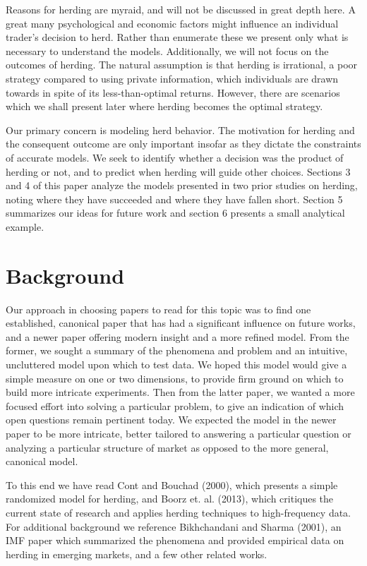 \documentclass{article}
\begin{document}
Reasons for herding are myraid, and will not be discussed in great depth here.
A great many psychological and economic factors might influence an individual trader's decision to herd. 
Rather than enumerate these we present only what is necessary to understand the models.
Additionally, we will not focus on the outcomes of herding.
The natural assumption is that herding is irrational, a poor strategy compared to using private information, which individuals are drawn towards in spite of its less-than-optimal returns.
However, there are scenarios which we shall present later where herding becomes the optimal strategy.

Our primary concern is modeling herd behavior.
The motivation for herding and the consequent outcome are only important insofar as they dictate the constraints of accurate models.
We seek to identify whether a decision was the product of herding or not, and to predict when herding will guide other choices.
Sections 3 and 4 of this paper analyze the models presented in two prior studies on herding, noting where they have succeeded and where they have fallen short. 
Section 5 summarizes our ideas for future work and section 6 presents a small analytical example.

\section{Background}
Our approach in choosing papers to read for this topic was to find one established, canonical paper that has had a significant influence on future works, and a newer paper offering modern insight and a more refined model.
From the former, we sought a summary of the phenomena and problem and an intuitive, uncluttered model upon which to test data.
We hoped this model would give a simple measure on one or two dimensions, to provide firm ground on which to build more intricate experiments.
Then from the latter paper, we wanted a more focused effort into solving a particular problem, to give an indication of which open questions remain pertinent today.
We expected the model in the newer paper to be more intricate, better tailored to answering a particular question or analyzing a particular structure of market as opposed to the more general, canonical model.

To this end we have read Cont and Bouchad (2000), which presents a simple randomized model for herding, and Boorz et. al. (2013), which critiques the current state of research and applies herding techniques to high-frequency data.
For additional background we reference Bikhchandani and Sharma (2001), an IMF paper which summarized the phenomena and provided empirical data on herding in emerging markets, and a few other related works.
\end{document}
